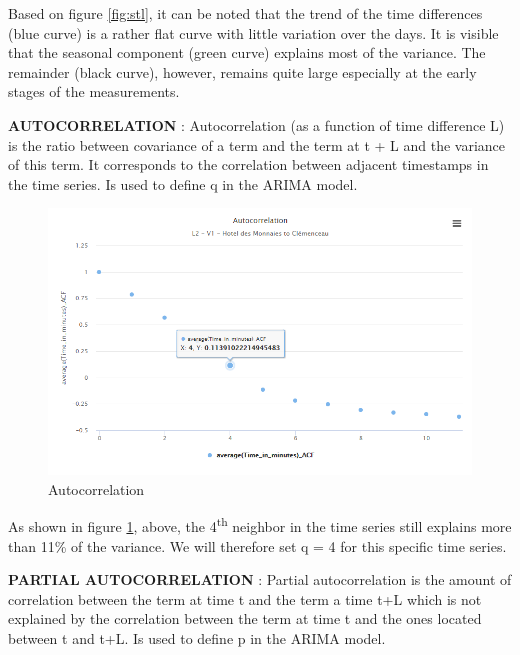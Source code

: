 \documentclass{article}
\begin{document}
Based on figure \ref{fig:stl}, it can be noted that the trend of the time differences (blue curve) is a rather flat curve with little variation over the days. It is visible that the seasonal component (green curve) explains most of the variance. The remainder (black curve), however, remains quite large especially at the early stages of the measurements.

\textbf{AUTOCORRELATION} : Autocorrelation (as a function of time difference L) is the ratio between covariance of a term and the term at t + L and the variance of this term. It corresponds to the correlation between adjacent timestamps in the time series. Is used to define q in the ARIMA model.
 
 \begin{figure}[H]
    \centering
    \includegraphics[width=\textwidth]{images/Fig4.png} 
    \caption{Autocorrelation}
    \label{fig:autocor}
\end{figure}
 
 As shown in figure \ref{fig:autocor}, above, the 4\textsuperscript{th} neighbor in the time series still explains more than 11\% of the variance. We will therefore set q = 4 for this specific time series.
 
 
 
\textbf{PARTIAL AUTOCORRELATION} : Partial autocorrelation is the amount of correlation between the term at time t and the term a time t+L which is not explained by the correlation between the term at time t and the ones located between t and t+L. Is used to define p in the ARIMA model.
\end{document}
